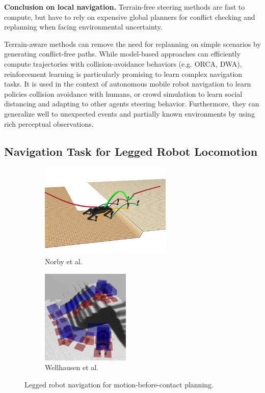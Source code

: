 \noindent\textbf{Conclusion on local navigation.}
Terrain-free steering methods are fast to compute, but have to rely on expensive global planners for conflict checking and replanning when facing environmental uncertainty.

Terrain-aware methods can remove the need for replanning on simple scenarios by generating conflict-free paths. %
While model-based approaches can efficiently compute trajectories with collision-avoidance behaviors (e.g. ORCA, DWA), reinforcement learning is particularly promising to learn complex navigation tasks.
It is used in the context of autonomous mobile robot navigation to learn policies collision avoidance with humans, or crowd simulation to learn social distancing and adapting to other agents steering behavior. 
Furthermore, they can generalize well to unexpected events and partially known environments by using rich perceptual observations.




\subsection{Navigation Task for Legged Robot Locomotion\label{subsub:nav:legged}}
\begin{figure}[h]
    \centering
    \captionsetup[subfigure]{justification=centering}
    \begin{subfigure}[t]{0.40\linewidth}
    \includegraphics[width=\textwidth,height=4.5cm]{Figures/Chapter_SOTA//norby_2022.png}
    \caption{Norby et al. \cite{norby_skd_2022}}
    \label{fig:legged_nav_0}
    \end{subfigure}
    \begin{subfigure}[t]{0.40\linewidth}
    \includegraphics[width=\textwidth,height=4.5cm]{Figures/Chapter_SOTA//hutter_guide_path.png}
    \caption{Wellhausen et al. \cite{rough_terrain_reachability_hutter_2021}}
    \label{fig:legged_nav_1}
    \end{subfigure}
    \caption{Legged robot navigation for motion-before-contact planning.}
\end{figure}

